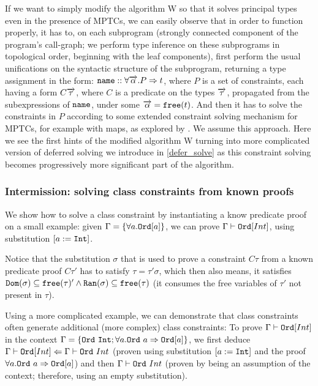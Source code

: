 If we want to simply modify the algorithm W so that it solves principal types even in the presence of MPTCs, we can easily observe that in order to function properly, it has to, on each subprogram (strongly connected component of the program's call-graph; we perform type inference on these subprograms in topological order, beginning with the leaf components), first perform the usual unifications on the syntactic structure of the subprogram, returning a type assignment in the form: $\mathtt{name} :: \forall \overrightarrow{\alpha} . P  \Rightarrow t$, where $P$ is a set of constraints, each having a form $C \overrightarrow{\tau}$, where $C$ is a predicate on the types $\overrightarrow{\tau}$, propagated from the subexpressions of $\mathtt{name}$, under some $\overrightarrow{\alpha} = \mathtt{free} (t)$. And then it has to solve the constraints in $P$ according to some extended constraint solving mechanism for MPTCs, for example with maps, as explored by \cite{jones2000type}. We assume this approach. Here we see the first hints of the modified algorithm W turning into more complicated version of deferred solving we introduce in \cref{defer_solve} as this constraint solving becomes progressively more significant part of the algorithm.

\subsubsection{Intermission: solving class constraints from known proofs}

We show how to solve a class constraint by instantiating a know predicate proof on a small example: given $\Gamma = \{\forall a . \mathtt{Ord} [a]\}$, we can prove $\Gamma \vdash \mathtt{Ord} [Int]$, using substitution $[a := \mathtt{Int}]$. \cite{jones1999typing}

Notice that the substitution $\sigma$ that is used to prove a constraint $C \tau$ from a known predicate proof $C \tau'$ has to satisfy $\tau = \tau' \sigma$, which then also means, it satisfies $\mathtt{Dom} (\sigma) \subseteq \mathtt{free} (\tau)' \land \mathtt{Ran} (\sigma) \subseteq \mathtt{free} (\tau)$ (it consumes the free variables of $\tau'$ not present in $\tau$).

Using a more complicated example, we can demonstrate that class constraints often generate additional (more complex) class constraints: To prove $\Gamma \vdash \mathtt{Ord} [Int]$ in the context $\Gamma = \{\mathtt{Ord}\ \mathtt{Int}; \forall a . \mathtt{Ord}\ a \Rightarrow \mathtt{Ord} [a]\}$, we first deduce $\Gamma \vdash \mathtt{Ord} [Int] \Leftarrow \Gamma \vdash \mathtt{Ord}\ Int$ (proven using substitution $[a := \mathtt{Int}]$ and the proof $\forall a . \mathtt{Ord}\ a \Rightarrow \mathtt{Ord} [a]$) and then $\Gamma \vdash \mathtt{Ord}\ Int$ (proven by being an assumption of the context; therefore, using an empty substitution).

